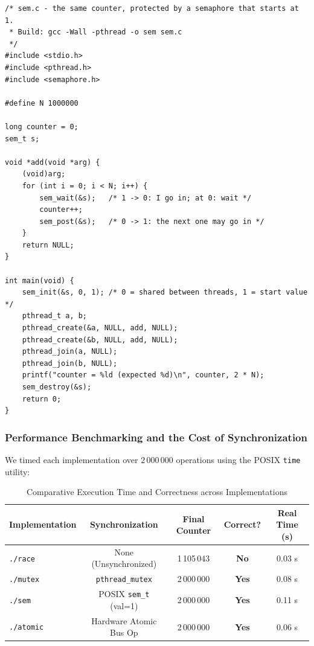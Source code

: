 \documentclass{labreport}
\begin{document}
\begin{lstlisting}[style=c]
/* sem.c - the same counter, protected by a semaphore that starts at 1.
 * Build: gcc -Wall -pthread -o sem sem.c
 */
#include <stdio.h>
#include <pthread.h>
#include <semaphore.h>

#define N 1000000

long counter = 0;
sem_t s;

void *add(void *arg) {
    (void)arg;
    for (int i = 0; i < N; i++) {
        sem_wait(&s);   /* 1 -> 0: I go in; at 0: wait */
        counter++;
        sem_post(&s);   /* 0 -> 1: the next one may go in */
    }
    return NULL;
}

int main(void) {
    sem_init(&s, 0, 1); /* 0 = shared between threads, 1 = start value */
    pthread_t a, b;
    pthread_create(&a, NULL, add, NULL);
    pthread_create(&b, NULL, add, NULL);
    pthread_join(a, NULL);
    pthread_join(b, NULL);
    printf("counter = %ld (expected %d)\n", counter, 2 * N);
    sem_destroy(&s);
    return 0;
}
\end{lstlisting}

\subsubsection{Performance Benchmarking and the Cost of Synchronization}
We timed each implementation over $2\,000\,000$ operations using the POSIX \texttt{time} utility:

\begin{table}[H]
\centering
\caption{Comparative Execution Time and Correctness across Implementations}
\begin{tabularx}{\textwidth}{lcccc}
\toprule
\textbf{Implementation} & \textbf{Synchronization} & \textbf{Final Counter} & \textbf{Correct?} & \textbf{Real Time (s)} \\
\midrule
\texttt{./race}    & None (Unsynchronized) & 1\,105\,043 & \textcolor{zshred}{\textbf{No}} & 0.03 s \\
\texttt{./mutex}   & \texttt{pthread\_mutex} & 2\,000\,000 & \textcolor{zshgreen}{\textbf{Yes}} & 0.08 s \\
\texttt{./sem}     & POSIX \texttt{sem\_t} (val=1) & 2\,000\,000 & \textcolor{zshgreen}{\textbf{Yes}} & 0.11 s \\
\texttt{./atomic}  & Hardware Atomic Bus Op & 2\,000\,000 & \textcolor{zshgreen}{\textbf{Yes}} & 0.06 s \\
\bottomrule
\end{tabularx}
\end{table}
\end{document}
